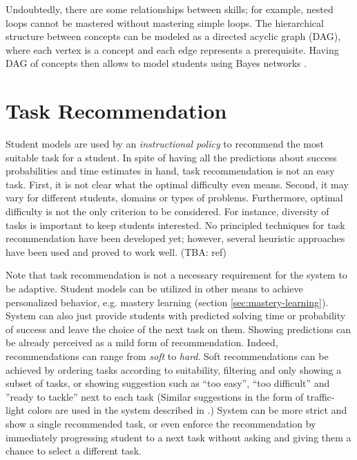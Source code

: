 Undoubtedly, there are some relationships between skills;
  for example, nested loops cannot be mastered without mastering simple loops.
The hierarchical structure between concepts can be modeled
  as a directed acyclic graph (DAG),
  where each vertex is a concept and each edge represents a prerequisite.
Having DAG of concepts then allows to model students using Bayes networks
  \cite{its-programming}.


\section{Task Recommendation}
\label{sec:task-recommendation}

Student models are used by an \emph{instructional policy} to recommend
  the most suitable task for a student.
In spite of having all the predictions about success probabilities
  and time estimates in hand,
  task recommendation is not an easy task.
First, it is not clear what the optimal difficulty even means.
Second, it may vary for different students, domains or types of problems.
Furthermore, optimal difficulty is not the only criterion to be considered.
For instance, diversity of tasks is important to keep students interested.
No principled techniques for task recommendation have been developed yet;
however, several heuristic approaches have been used
  and proved to work well. (TBA: ref)


Note that task recommendation is not a necessary requirement
  for the system to be adaptive.
Student models can be utilized in other means to achieve personalized behavior,
  e.g. mastery learning (section \ref{sec:mastery-learning}).
System can also just provide students with predicted solving time
  or probability of success
  and leave the choice of the next task on them.
Showing predictions can be already perceived as a mild form of recommendation.
Indeed, recommendations can range from \emph{soft} to \emph{hard}.
Soft recommendations can be achieved by
  ordering tasks according to suitability,
  filtering and only showing a subset of tasks,
  or showing suggestion such as
  ``too easy'', ``too difficult'' and ''ready to tackle'' next to each task
  (Similar suggestions in the form of traffic-light colors
  are used in the system described in \cite{its-programming}.)
System can be more strict and show a single recommended task,
  or even enforce the recommendation by immediately progressing student to
  a next task without asking and giving them a chance to select a different task.

